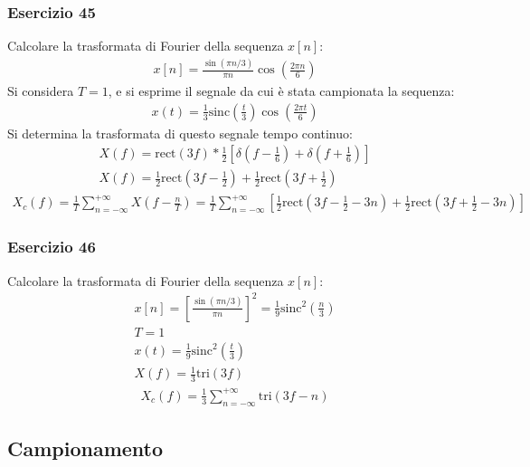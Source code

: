 \documentclass{article}
\newcommand{\rect}{\mathrm{rect}}
\newcommand{\sinc}{\mathrm{sinc}}
\newcommand{\tri}{\mathrm{tri}}
\begin{document}
\subsubsection*{Esercizio 45}

Calcolare la trasformata di Fourier della sequenza $x[n]$:
\begin{gather*}
    x[n]=\displaystyle\frac{\sin(\pi n/3)}{\pi n}\cos\left(\frac{2\pi n}{6}\right)
\end{gather*}
Si considera $T=1$, e si esprime il segnale da cui è stata campionata la sequenza:
\begin{gather*}
    x(t)=\frac{1}{3}\sinc\left(\frac{t}{3}\right)\cos\left(\frac{2\pi t}{6}\right)
\end{gather*}
Si determina la trasformata di questo segnale tempo continuo:
\begin{gather*}
    X(f)=\displaystyle\rect(3f)*\frac{1}{2}\left[\delta\left(f-\frac{1}{6}\right)+\delta\left(f+\frac{1}{6}\right)\right]\\
    X(f)=\displaystyle\frac{1}{2}\rect\left(3f-\frac{1}{2}\right)+\frac{1}{2}\rect\left(3f+\frac{1}{2}\right)
\end{gather*}
\begin{gather}
    X_c(f)=\displaystyle\frac{1}{T}\sum_{n=-\infty}^{+\infty}X\left(f-\frac{n}{T}\right)=\frac{1}{T}\sum_{n=-\infty}^{+\infty}\left[\frac{1}{2}\rect\left(3f-\frac{1}{2}-3n\right)+\frac{1}{2}\rect\left(3f+\frac{1}{2}-3n\right)\right]
\end{gather}

\subsubsection*{Esercizio 46}

Calcolare la trasformata di Fourier della sequenza $x[n]$:
\begin{gather*}
    x[n]=\left[\displaystyle\frac{\sin(\pi n/3)}{\pi n}\right]^2=\frac{1}{9}\sinc^2\left(\frac{n}{3}\right)\\
    T=1\\
    x(t)=\displaystyle\frac{1}{9}\sinc^2\left(\frac{t}{3}\right)\\
    X(f)=\displaystyle \frac{1}{3}\tri (3f)
\end{gather*}
\begin{gather}
    X_c(f)=\displaystyle\frac{1}{3}\sum_{n=-\infty}^{+\infty}\tri (3f-n)
\end{gather}

\subsection{Campionamento}
\end{document}
